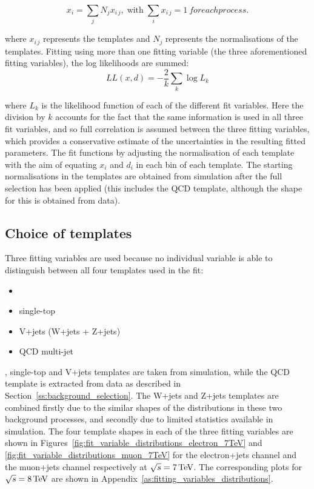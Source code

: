 \begin{equation}
\label{eq:sum_mc}
x_i = \sum\limits_{j}N_{j}x_{i\,j},\;\text{with}\;\sum\limits_{i}x_{i\,j}=1\ for each process.
\end{equation}

where $x_{i\,j}$ represents the templates and $N_{j}$ represents the normalisations of the templates.
Fitting using more than one fitting variable (the three aforementioned fitting variables), the log likelihoods are summed:
\begin{equation}
\label{eq:log_L_final}
LL\left(x, d\right) = -\frac{2}{k} \sum\limits_{k} \log{L_k}
\end{equation}

where $L_k$ is the likelihood function of each of the different fit variables. Here the division by $k$
accounts for the fact that the same information is used in all three fit variables, and so full correlation is
assumed between the three fitting variables, which provides a conservative estimate of the uncertainties in
the resulting fitted parameters.
The fit functions by adjusting the normalisation of each template with the aim of equating $x_{i}$ and $d_{i}$
in each bin of each template. The starting normalisations in the templates are obtained from simulation after
the full selection has been applied (this includes the QCD template, although the shape for this is obtained
from data).

\subsection{Choice of templates}
\label{choice_of_templates}

Three fitting variables are used because no individual variable is able to distinguish between all four
templates used in the fit:

\begin{itemize}
  \item {\ttbar}
  \item{single-top}
  \item{V+jets (W+jets + Z+jets)}
  \item{QCD multi-jet} 
\end{itemize}

\ttbar, single-top and V+jets templates are taken from simulation, while the QCD template is extracted from
data as described in Section~\ref{ss:background_selection}. The W+jets and Z+jets templates are combined
firstly due to the similar shapes of the distributions in these two background processes, and secondly due to
limited statistics available in simulation. The four template shapes in each of the three fitting variables
are shown in Figures~\ref{fig:fit_variable_distributions_electron_7TeV} and
\ref{fig:fit_variable_distributions_muon_7TeV} for the electron+jets channel and the muon+jets channel
respectively at $\sqrt{s}=7\,\text{Te\hspace{-.08em}V}$. The corresponding plots for $\sqrt{s}=8\,\text{Te\hspace{-.08em}V}$ are shown in
Appendix~\ref{as:fitting_variables_distributions}.


